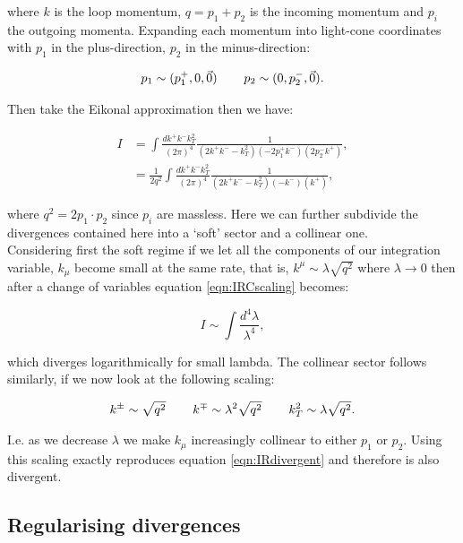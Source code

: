 		where $k$ is the loop momentum, $q=p_1+p_2$ is the incoming momentum and $p_i$ the outgoing
		momenta.  Expanding each momentum into light-cone coordinates with $p_1$ in the plus-direction,
		$p_2$ in the minus-direction:

		\begin{align}
			p_1 \sim (p_1^+, 0, \vec{0}) \hspace{0.75cm} p_2 \sim (0, p_2^-, \vec{0}).
		\end{align}

		Then take the Eikonal approximation then we have:

		\begin{align}
			I &= \int\frac{dk^+k^-k^2_T}{(2\pi)^4}\frac{1}{(2k^+k^- - k_T^2)(-2p_1^+k^-)(2p_2^-k^+)},\\
			  &= \frac{1}{2q^2}\int\frac{dk^+k^-k^2_T}{(2\pi)^4}\frac{1}{(2k^+k^- - k_T^2)(-k^-)(k^+)},
			  \label{eqn:IRCscaling}
		\end{align}

		where $q^2=2p_1\cdot p_2$ since $p_i$ are massless.  Here we can further subdivide the divergences
		contained here into a `soft' sector and a collinear one.\\Considering first the soft regime if we
		let all the components of our integration variable, $k_\mu$ become small at the same rate, that is,
		$k^\mu\sim\lambda\sqrt{q^2}$ where $\lambda\rightarrow0$ then after a change of variables equation
		\eqref{eqn:IRCscaling} becomes:

		\begin{equation}
			I \sim\int\frac{d^4\lambda}{\lambda^4},
			\label{eqn:IRdivergent}
		\end{equation}

		which diverges logarithmically for small lambda.  The collinear sector follows similarly, if we now
		look at the following scaling:

		\begin{align}
			k^\pm\sim\sqrt{q^2}\hspace{0.75cm}k^\mp\sim\lambda^2\sqrt{q^2}\hspace{0.75cm}k_T^2\sim\lambda\sqrt{q^2}.
		\end{align}

		I.e. as we decrease $\lambda$ we make $k_\mu$ increasingly collinear to either $p_1$ or $p_2$.  Using
		this scaling exactly reproduces equation \eqref{eqn:IRdivergent} and therefore is also divergent.

	\subsection{Regularising divergences}

